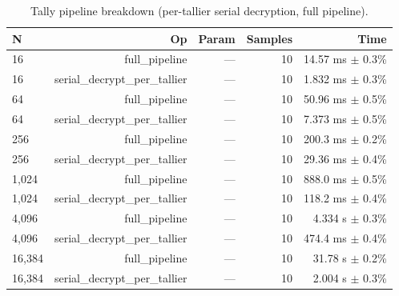 \begin{table}[h]
  \centering
  \caption{Tally pipeline breakdown (per-tallier serial decryption, full pipeline).}
  \label{tab:g6_tally_breakdown}
  \begin{tabular}{lrrrr}
    \toprule
    N & Op & Param & Samples & Time \\
    \midrule
16 & full\_pipeline & — & 10 & 14.57 ms $\pm$ 0.3\% \\
16 & serial\_decrypt\_per\_tallier & — & 10 & 1.832 ms $\pm$ 0.3\% \\
64 & full\_pipeline & — & 10 & 50.96 ms $\pm$ 0.5\% \\
64 & serial\_decrypt\_per\_tallier & — & 10 & 7.373 ms $\pm$ 0.5\% \\
256 & full\_pipeline & — & 10 & 200.3 ms $\pm$ 0.2\% \\
256 & serial\_decrypt\_per\_tallier & — & 10 & 29.36 ms $\pm$ 0.4\% \\
1,024 & full\_pipeline & — & 10 & 888.0 ms $\pm$ 0.5\% \\
1,024 & serial\_decrypt\_per\_tallier & — & 10 & 118.2 ms $\pm$ 0.4\% \\
4,096 & full\_pipeline & — & 10 & 4.334 s $\pm$ 0.3\% \\
4,096 & serial\_decrypt\_per\_tallier & — & 10 & 474.4 ms $\pm$ 0.4\% \\
16,384 & full\_pipeline & — & 10 & 31.78 s $\pm$ 0.2\% \\
16,384 & serial\_decrypt\_per\_tallier & — & 10 & 2.004 s $\pm$ 0.3\% \\
    \bottomrule
  \end{tabular}
\end{table}
